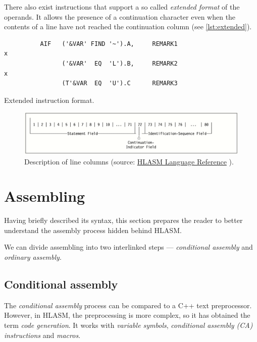 There also exist instructions that support a so called \emph{extended format} of the operands. It allows the presence of a continuation character even when the contents of a line have not reached the continuation column (see \cref{lst:extended}).

\begin{listing}
\begin{verbatim}
          AIF   ('&VAR' FIND '~').A,     REMARK1                        x
                ('&VAR'  EQ  'L').B,     REMARK2                        x
                (T'&VAR  EQ  'U').C      REMARK3 
\end{verbatim}
\caption{Extended instruction format.}
\label{lst:extended}
\end{listing}

\begin{figure}
	\includegraphics[width=\textwidth]{img/line}
	\caption{Description of line columns (source: \href{https://www-01.ibm.com/servers/resourcelink/svc00100.nsf/pages/zOSV2R3sc264940/$file/asmr1023.pdf}{HLASM Language Reference} ).}
	\label{fig01:line}
\end{figure}


\section{Assembling}

Having briefly described its syntax, this section prepares the reader to better understand the assembly process hidden behind HLASM. 

We can divide assembling into two interlinked steps --- \emph{conditional assembly} and \emph{ordinary assembly}.

\subsection{Conditional assembly}

The \emph{conditional assembly} process can be compared to a C++ text preprocessor. However, in HLASM, the preprocessing is more complex, so it has obtained the term \emph{code generation}. It works with \emph{variable symbols}, \emph{conditional assembly (CA) instructions} and \emph{macros}. 

